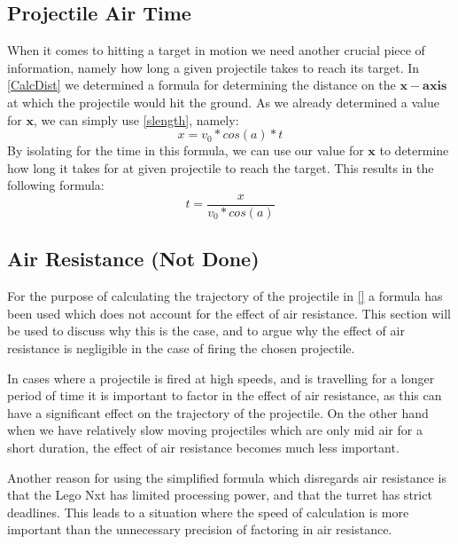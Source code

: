 \subsection{Projectile Air Time}
When it comes to hitting a target in motion we need another crucial piece of information,
namely how long a given projectile takes to reach its target.
In \autoref{CalcDist} we determined a formula for determining the distance on
the $\mathbf{x-axis}$ at which the projectile would hit the ground. As we
already determined a value for $\mathbf{x}$, we can simply use
\autoref{slength}, namely:
\begin{equation}
x=v_0*cos(a)*t
\end{equation}
By isolating for the time in this formula, we can use our value for $\mathbf{x}$
to determine how long it takes for at given projectile to reach the target. This
results in the following formula:
\begin{equation}\label{TimeEq}
t=\frac{x}{v_0*cos(a)}
\end{equation}

\subsection{Air Resistance (Not Done)}\label{AirResDisc}
For the purpose of calculating the trajectory of the projectile in \autoref{} a
formula has been used which does not account for the effect of air resistance.
This section will be used to discuss why this is the case, and to argue why the
effect of air resistance is negligible in the case of firing the chosen
projectile.\nl

In cases where a projectile is fired at high speeds, and is travelling for a
longer period of time it is important to factor in the effect of air resistance,
as this can have a significant effect on the trajectory of the projectile. On
the other hand when we have relatively slow moving projectiles which are only mid
air for a short duration, the effect of air resistance becomes much less
important.\nl

Another reason for using the simplified formula which disregards air resistance
is that the Lego Nxt has limited processing power, and that the turret has
strict deadlines. This leads to a situation where the speed of calculation is
more important than the unnecessary precision of factoring in air resistance.



